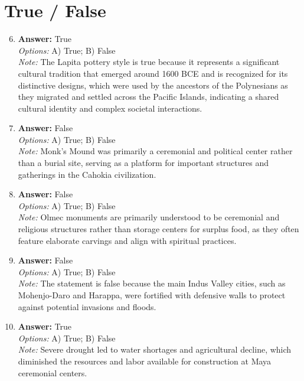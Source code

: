\documentclass[12pt]{article}
\begin{document}
\section*{True / False}
\begin{enumerate}[label=\arabic*.]
\setcounter{enumi}{5}
\item \textbf{Answer:} True
\\ \textit{Options:} A) True; B) False
\\ \textit{Note:} The Lapita pottery style is true because it represents a significant cultural tradition that emerged around 1600 BCE and is recognized for its distinctive designs, which were used by the ancestors of the Polynesians as they migrated and settled across the Pacific Islands, indicating a shared cultural identity and complex societal interactions.
\item \textbf{Answer:} False
\\ \textit{Options:} A) True; B) False
\\ \textit{Note:} Monk's Mound was primarily a ceremonial and political center rather than a burial site, serving as a platform for important structures and gatherings in the Cahokia civilization.
\item \textbf{Answer:} False
\\ \textit{Options:} A) True; B) False
\\ \textit{Note:} Olmec monuments are primarily understood to be ceremonial and religious structures rather than storage centers for surplus food, as they often feature elaborate carvings and align with spiritual practices.
\item \textbf{Answer:} False
\\ \textit{Options:} A) True; B) False
\\ \textit{Note:} The statement is false because the main Indus Valley cities, such as Mohenjo-Daro and Harappa, were fortified with defensive walls to protect against potential invasions and floods.
\item \textbf{Answer:} True
\\ \textit{Options:} A) True; B) False
\\ \textit{Note:} Severe drought led to water shortages and agricultural decline, which diminished the resources and labor available for construction at Maya ceremonial centers.
\end{enumerate}
\end{document}
